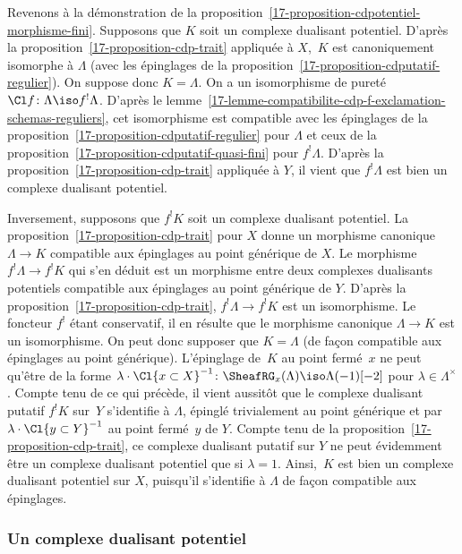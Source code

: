 \documentclass[10pt]{../fichiers-configuration-latex/smfart}
\begin{document}
\bigskip

Revenons à la démonstration de la
proposition~\ref{17-proposition-cdpotentiel-morphisme-fini}. Supposons que $K$
soit un complexe dualisant potentiel. D'après la
proposition~\ref{17-proposition-cdp-trait} appliquée à $X$, $K$ est
canoniquement isomorphe à $\Lambda$ (avec les épinglages de la
proposition~\ref{17-proposition-cdputatif-regulier}). On suppose donc
$K=\Lambda$. On a un isomorphisme de pureté
$\Cl f\colon \Lambda\iso f^!\Lambda$.
D'après le lemme~\ref{17-lemme-compatibilite-cdp-f-exclamation-schemas-reguliers}, cet isomorphisme est compatible avec les épinglages de la
proposition~\ref{17-proposition-cdputatif-regulier} pour $\Lambda$ et ceux de
la proposition~\ref{17-proposition-cdputatif-quasi-fini} pour $f^!\Lambda$.
D'après la proposition~\ref{17-proposition-cdp-trait} appliquée à $Y$,
il vient que
$f^!\Lambda$ est bien un complexe dualisant potentiel.

Inversement, supposons que $f^!K$ soit un complexe dualisant potentiel. La
proposition~\ref{17-proposition-cdp-trait} pour $X$
donne un morphisme canonique
$\Lambda\to K$ compatible aux épinglages au point générique de $X$.
Le morphisme $f^!\Lambda\to f^!K$ qui s'en déduit est un morphisme entre
deux complexes dualisants potentiels compatible aux épinglages au point
générique de $Y$.
D'après la proposition~\ref{17-proposition-cdp-trait},
$f^!\Lambda\to f^!K$ est un isomorphisme. Le foncteur $f^!$ étant
conservatif, il en résulte que le morphisme canonique $\Lambda\to K$ est un
isomorphisme. On peut donc supposer que $K=\Lambda$ (de façon compatible
aux épinglages au 
point générique). 
L'épinglage de $K$ au point fermé $x$ ne peut qu'être de la forme
$\lambda\cdot \Cl {x\subset X}^{-1}\colon \SheafRG_x(\Lambda)\iso
\Lambda(-1)[-2]$ pour $\lambda\in\Lambda^\times$. Compte tenu de ce qui
précède, il vient aussitôt
que le complexe dualisant putatif $f^!K$ sur $Y$ s'identifie à $\Lambda$,
épinglé trivialement au point générique et par $\lambda\cdot \Cl {y\subset
Y}^{-1}$ au point fermé $y$ de $Y$. Compte tenu de la
proposition~\ref{17-proposition-cdp-trait}, ce complexe dualisant putatif sur
$Y$ ne peut évidemment être un complexe dualisant potentiel que si
$\lambda=1$. Ainsi, $K$ est bien un complexe dualisant potentiel sur $X$,
puisqu'il s'identifie à $\Lambda$ de façon compatible aux épinglages.

\subsubsection{Un complexe dualisant potentiel}%
\end{document}
